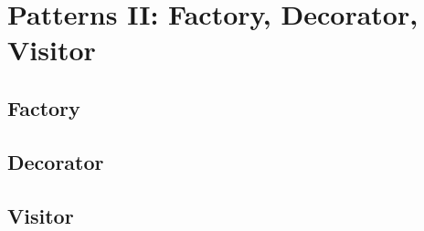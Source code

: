 \chapter{Patterns II: Factory, Decorator, Visitor}

\section{Factory}

\section{Decorator}

\section{Visitor}
